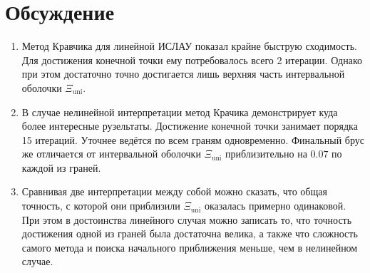 \section{Обсуждение}
\begin{enumerate}
    \item Метод Кравчика для линейной ИСЛАУ показал крайне быструю сходимость. Для достижения конечной точки ему потребовалось всего 2 итерации. Однако при этом достаточно точно достигается лишь верхняя часть интервальной оболочки $\Xi_{\mathrm{uni}}$.
    \item В случае нелинейной интерпретации метод Крачика демонстрирует куда более интересные рузельтаты. Достижение конечной точки занимает порядка 15 итераций. Уточнее ведётся по всем граням одновременно. Финальный брус же отличается от интервальной оболочки $\Xi_{\mathrm{uni}}$ приблизительно на $0.07$ по каждой из граней.
    \item Сравнивая две интерпретации между собой можно сказать, что общая точность, с которой они приблизили $\Xi_{\mathrm{uni}}$ оказалась примерно одинаковой. При этом в достоинства линейного случая можно записать то, что точность достижения одной из граней была достаточна велика, а также что сложность самого метода и поиска начального приближения меньше, чем в нелинейном случае.
\end{enumerate}